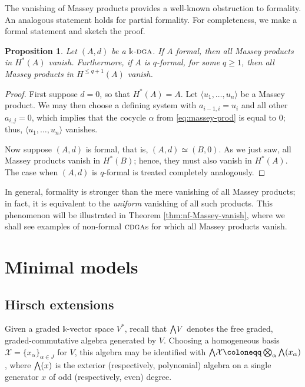 \documentclass{article}
\numberwithin{equation}{section}
\newtheorem{proposition}[theorem]{Proposition}
\theoremstyle{definition}
\renewcommand{\k}{\mathbb{k}}
\newcommand{\XX}{{\mathcal{X}}}
\newcommand{\dga}{\ensuremath{\textsc{dga}}}
\newcommand{\cdga}{\ensuremath{\textsc{cdga}}}
\newcommand{\bwedge}{\mbox{\normalsize $\bigwedge$}}
\begin{document}
The vanishing of Massey products provides a well-known 
obstruction to formality. An analogous statement 
holds for partial formality. For completeness, we 
make a formal statement and sketch the proof.

\begin{proposition}
\label{prop:massey-formal}
Let $(A,d)$ be a $\k$-$\dga$.  If $A$ formal, then all Massey 
products in $H^{*}(A)$ vanish. Furthermore, if $A$ is $q$-formal, 
for some $q\ge 1$, then all Massey products in $H^{\le q+1}(A)$ vanish.
\end{proposition}

\begin{proof}
First suppose $d=0$, so that $H^*(A)=A$. Let 
$\langle u_1, \dots, u_n\rangle$ be a Massey product. 
We may then choose a defining system with $a_{i-1,i}=u_i$ 
and all other $a_{i,j}=0$, which implies that the cocycle 
$\alpha$ from \eqref{eq:massey-prod} is equal to $0$; 
thus, $\langle u_1, \dots, u_n\rangle$ vanishes. 

Now suppose $(A,d)$ is formal, that is, $(A,d)\simeq (B,0)$. 
As we just saw, all Massey products vanish in $H^*(B)$; hence, 
they must also vanish in $H^*(A)$. The case when $(A,d)$ is 
$q$-formal is treated completely analogously.
\end{proof}

In general, formality is stronger than the mere vanishing 
of all Massey products; in fact, it is equivalent to the
{\em uniform}\/ vanishing of all such products. This 
phenomenon will be illustrated in Theorem \ref{thm:nf-Massey-vanish}, 
where we shall see examples of non-formal $\cdga$s for which 
all Massey products vanish.

\section{Minimal models}
\label{sect:min-mod}

\subsection{Hirsch extensions}
\label{subsec:hirsch}
Given a graded $\k$-vector space $V^*$, recall that $\bwedge V$  
denotes the free graded, graded-com\-mutative algebra generated by $V$. 
Choosing a homogeneous basis $\XX=\{x_{\alpha}\}_{\alpha\in J}$ 
for $V$, this algebra may be identified with 
$\bwedge \XX\coloneqq \bigotimes_{\alpha} \bwedge (x_{\alpha})$, 
where $\bwedge (x)$ is the exterior (respectively, polynomial) 
algebra on a single generator $x$ of odd (respectively, even) degree. 
\end{document}
